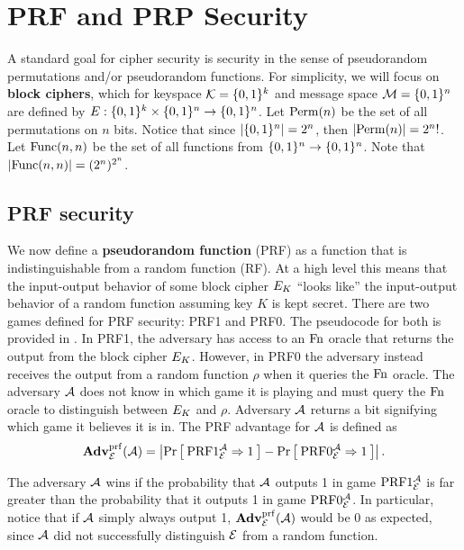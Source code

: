 \section{PRF and PRP Security}
\label{sec:prf}

A standard goal for cipher security is security in the sense of pseudorandom permutations and/or pseudorandom functions. For simplicity, we will focus on \textbf{block ciphers}, which for keyspace ${\cal K}=\{0,1\}^k$ and message space ${\cal M}=\{0,1\}^n$ are defined by $E : \{0,1\}^k \times \{0,1\}^n \to \{0,1\}^n$. Let $\mathrm{Perm}(n)$ be the set of all permutations on $n$ bits. Notice that since $|\{0,1\}^n| = 2^n$, then $|\mathrm{Perm}(n)| = 2^n!$. Let $\mathrm{Func}(n,n)$ be the set of all functions from $\{0,1\}^n \to \{0,1\}^n$. Note that $|\mathrm{Func}(n,n)| = (2^n)^{2^n}$.

\subsection{PRF security}

We now define a \textbf{pseudorandom function} (PRF) as a function that is indistinguishable from a random function (RF). At a high level this means that the input-output behavior of some block cipher $E_K$ ``looks like'' the input-output behavior of a random function assuming key $K$ is kept secret. There are two games defined for PRF security: PRF1 and PRF0. The pseudocode for both is provided in . In PRF1, the adversary has access to an $\textnormal{Fn}$ oracle that returns the output from the block cipher $E_K$. However, in PRF0 the adversary instead receives the output from a random function $\rho$ when it queries the $\textnormal{Fn}$ oracle. The adversary ${\mathcal A}$ does not know in which game it is playing and must query the $\textnormal{Fn}$ oracle to distinguish between $E_K$ and $\rho$. Adversary ${\mathcal A}$ returns a bit signifying which game it believes it is in. The PRF advantage for ${\mathcal A}$ is defined as 
\begin{equation*}
\mathbf{Adv}^{\mathrm{prf}}_{{\cal E}}({\mathcal A}) = \left| \Pr\left[\: \textnormal{PRF}1_{\cal E}^{\mathcal A}\Rightarrow 1 \:\right] 
- \Pr\left[\: \textnormal{PRF}0_{\cal E}^{\mathcal A}\Rightarrow1 \:\right] \right|.
\end{equation*}

The adversary ${\mathcal A}$ wins if the probability that ${\mathcal A}$ outputs 1 in game $\textnormal{PRF}1_{\cal E}^{\mathcal A}$ is far greater than the probability that it outputs 1 in game $\textnormal{PRF}0_{\cal E}^{\mathcal A}$. In particular, notice that if ${\mathcal A}$ simply always output 1, $\mathbf{Adv}^{\mathrm{prf}}_{{\cal E}}({\mathcal A})$ would be 0 as expected, since ${\mathcal A}$ did not successfully distinguish ${\cal E}$ from a random function. 

